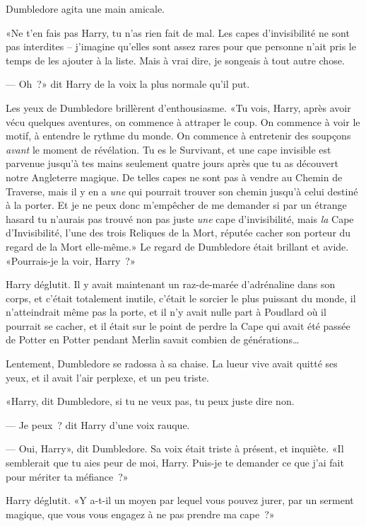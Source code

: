 Dumbledore agita une main amicale.

«Ne t'en fais pas Harry, tu n'as rien fait de mal. Les capes d'invisibilité ne sont pas interdites -- j'imagine qu'elles sont assez rares pour que personne n'ait pris le temps de les ajouter à la liste. Mais à vrai dire, je songeais à tout autre chose.

--- Oh~?» dit Harry de la voix la plus normale qu'il put.

Les yeux de Dumbledore brillèrent d'enthousiasme. «Tu vois, Harry, après avoir vécu quelques aventures, on commence à attraper le coup. On commence à voir le motif, à entendre le rythme du monde. On commence à entretenir des soupçons \emph{avant} le moment de révélation. Tu es le Survivant, et une cape invisible est parvenue jusqu'à tes mains seulement quatre jours après que tu as découvert notre Angleterre magique. De telles capes ne sont pas à vendre au Chemin de Traverse, mais il y en a \emph{une} qui pourrait trouver son chemin jusqu'à celui destiné à la porter. Et je ne peux donc m'empêcher de me demander si par un étrange hasard tu n'aurais pas trouvé non pas juste \emph{une} cape d'invisibilité, mais \emph{la} Cape d'Invisibilité, l'une des trois Reliques de la Mort, réputée cacher son porteur du regard de la Mort elle-même.» Le regard de Dumbledore était brillant et avide. «Pourrais-je la voir, Harry~?»

Harry déglutit. Il y avait maintenant un raz-de-marée d'adrénaline dans son corps, et c'était totalement inutile, c'était le sorcier le plus puissant du monde, il n'atteindrait même pas la porte, et il n'y avait nulle part à Poudlard où il pourrait se cacher, et il était sur le point de perdre la Cape qui avait été passée de Potter en Potter pendant Merlin savait combien de générations…

Lentement, Dumbledore se radossa à sa chaise. La lueur vive avait quitté ses yeux, et il avait l'air perplexe, et un peu triste.

«Harry, dit Dumbledore, si tu ne veux pas, tu peux juste dire non.

--- Je peux~? dit Harry d'une voix rauque.

--- Oui, Harry», dit Dumbledore. Sa voix était triste à présent, et inquiète. «Il semblerait que tu aies peur de moi, Harry. Puis-je te demander ce que j'ai fait pour mériter ta méfiance~?»

Harry déglutit. «Y a-t-il un moyen par lequel vous pouvez jurer, par un serment magique, que vous vous engagez à ne pas prendre ma cape~?»

